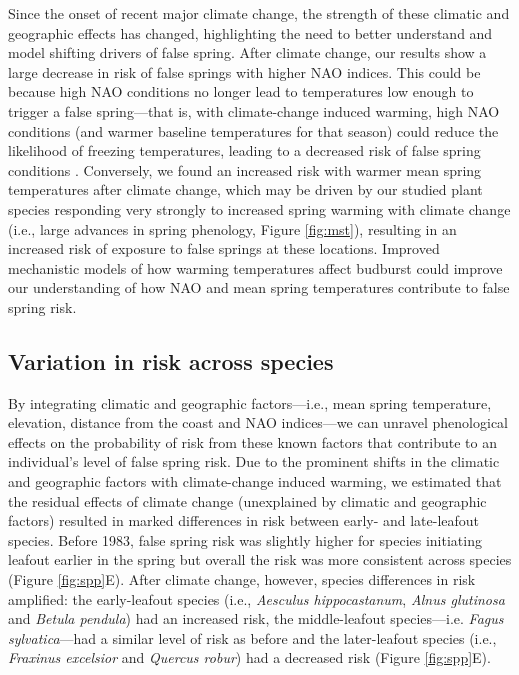 \documentclass{article}\usepackage[]{graphicx}\usepackage[]{color}
\begin{document}
Since the onset of recent major climate change, the strength of these climatic and geographic effects has changed, highlighting the need to better understand and model shifting drivers of false spring. After climate change, our results show a large decrease in risk of false springs with higher NAO indices. This could be because high NAO conditions no longer lead to temperatures low enough to trigger a false spring---that is, with climate-change induced warming, high NAO conditions (and warmer baseline temperatures for that season) could reduce the likelihood of freezing temperatures, leading to a decreased risk of false spring conditions \citep{Screen2017}. Conversely, we found an increased risk with warmer mean spring temperatures after climate change, which may be driven by our studied plant species responding very strongly to increased spring warming with climate change (i.e., large advances in spring phenology, Figure \ref{fig:mst}), resulting in an increased risk of exposure to false springs at these locations. Improved mechanistic models of how warming temperatures affect budburst \citep{Gauzere2019,Gauzere2017,Chuine2016} could improve our understanding of how NAO and mean spring temperatures contribute to false spring risk.  

\subsection*{Variation in risk across species} 
By integrating climatic and geographic factors---i.e., mean spring temperature, elevation, distance from the coast and NAO indices---we can unravel phenological effects on the probability of risk from these known factors that contribute to an individual's level of false spring risk. Due to the prominent shifts in the climatic and geographic factors with climate-change induced warming, we estimated that the residual effects of climate change (unexplained by climatic and geographic factors) resulted in marked differences in risk between early- and late-leafout species. Before 1983, false spring risk was slightly higher for species initiating leafout earlier in the spring but overall the risk was more consistent across species (Figure \ref{fig:spp}E). After climate change, however, species differences in risk amplified: the early-leafout species (i.e., \textit{Aesculus hippocastanum}, \textit{Alnus glutinosa} and \textit{Betula pendula}) had an increased risk, the middle-leafout species---i.e. \textit{Fagus sylvatica}---had a similar level of risk as before and the later-leafout species (i.e., \textit{Fraxinus excelsior} and \textit{Quercus robur}) had a decreased risk (Figure \ref{fig:spp}E). 
\end{document}
